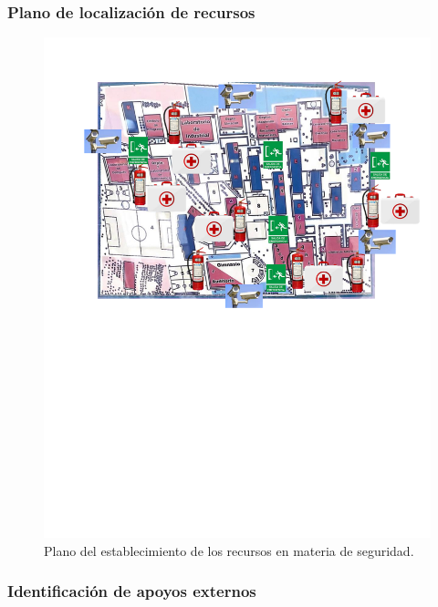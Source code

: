     \subsubsection{Plano de localización de recursos}
    \begin{figure}[H]
        \centering
        \includegraphics[trim = {30mm 130mm 5mm 21mm},clip,scale=0.5]{3/Img/planoDeEstablecimiento.pdf}
        \caption{Plano del establecimiento de los recursos en materia de seguridad.} 
        \label{fig:Plano de establecimiento}
    \end{figure}
    \subsubsection{ Identificación de apoyos externos}
    
